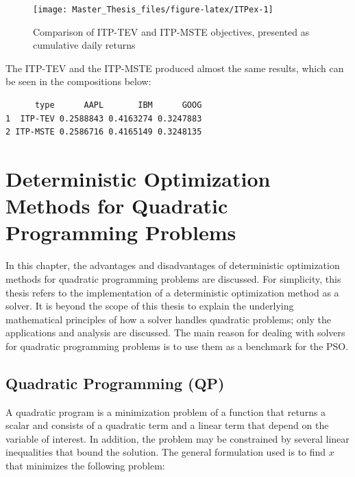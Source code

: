 \documentclass[
  oneside, a4paper, 12pt, openany]{book}
\theoremstyle{definition}
\theoremstyle{definition}
\theoremstyle{definition}
\theoremstyle{definition}
\theoremstyle{remark}
\begin{document}
\begin{figure}[H]
\texttt{[image: Master\_Thesis\_files/figure-latex/ITPex-1]} \caption{Comparison of ITP-TEV and ITP-MSTE objectives, presented as cumulative daily returns}\label{fig:ITPex}
\end{figure}

The ITP-TEV and the ITP-MSTE produced almost the same results, which can be seen in the compositions below:

\vspace{0.1cm}\fontsize{11}{12}\selectfont

\begin{verbatim}
      type      AAPL       IBM      GOOG
1  ITP-TEV 0.2588843 0.4163274 0.3247883
2 ITP-MSTE 0.2586716 0.4165149 0.3248135
\end{verbatim}

\normalsize\vspace{0.1cm}

\hypertarget{analyticalsolver}{%
\chapter{Deterministic Optimization Methods for Quadratic Programming Problems}\label{analyticalsolver}}


In this chapter, the advantages and disadvantages of deterministic optimization methods for quadratic programming problems are discussed. For simplicity, this thesis refers to the implementation of a deterministic optimization method as a solver. It is beyond the scope of this thesis to explain the underlying mathematical principles of how a solver handles quadratic problems; only the applications and analysis are discussed. The main reason for dealing with solvers for quadratic programming problems is to use them as a benchmark for the PSO.

\hypertarget{quadratic-programming-qp}{%
\section{Quadratic Programming (QP)}\label{quadratic-programming-qp}}

A quadratic program is a minimization problem of a function that returns a scalar and consists of a quadratic term and a linear term that depend on the variable of interest. In addition, the problem may be constrained by several linear inequalities that bound the solution. The general formulation used is to find \(x\) that minimizes the following problem:
\end{document}
